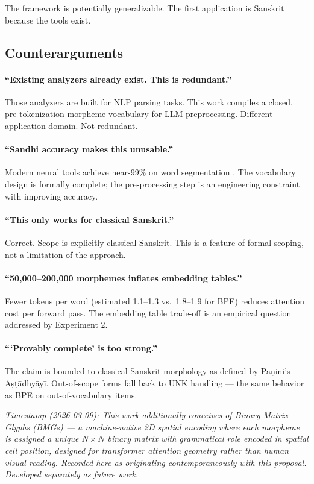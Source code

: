 \documentclass[11pt]{article}
\begin{document}
The framework is potentially generalizable. The first application is Sanskrit because the tools exist.

\subsection{Counterarguments}

\paragraph{``Existing analyzers already exist. This is redundant.''}
Those analyzers are built for NLP parsing tasks. This work compiles a closed, pre-tokenization morpheme vocabulary for LLM preprocessing. Different application domain. Not redundant.

\paragraph{``Sandhi accuracy makes this unusable.''}
Modern neural tools achieve near-99\% on word segmentation \citep{sandhan2022}. The vocabulary design is formally complete; the pre-processing step is an engineering constraint with improving accuracy.

\paragraph{``This only works for classical Sanskrit.''}
Correct. Scope is explicitly classical Sanskrit. This is a feature of formal scoping, not a limitation of the approach.

\paragraph{``50,000--200,000 morphemes inflates embedding tables.''}
Fewer tokens per word (estimated 1.1--1.3 vs.\ 1.8--1.9 for BPE) reduces attention cost per forward pass. The embedding table trade-off is an empirical question addressed by Experiment 2.

\paragraph{```Provably complete' is too strong.''}
The claim is bounded to classical Sanskrit morphology as defined by P\={a}\d{n}ini's A\d{s}\d{t}\={a}dhy\={a}y\={i}. Out-of-scope forms fall back to UNK handling --- the same behavior as BPE on out-of-vocabulary items.

\bigskip
\noindent\textit{Timestamp (2026-03-09): This work additionally conceives of Binary Matrix Glyphs (BMGs) --- a machine-native 2D spatial encoding where each morpheme is assigned a unique $N{\times}N$ binary matrix with grammatical role encoded in spatial cell position, designed for transformer attention geometry rather than human visual reading. Recorded here as originating contemporaneously with this proposal. Developed separately as future work.}
\end{document}
